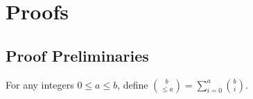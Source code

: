 \documentclass[final, 12pt]{colt2018}
\providecommand{\CD}{\mathrm{CD}}
\renewcommand{\eqref}[1]{Eq.~(\ref{#1})}
\newcommand{\thmref}[1]{Thm.~\ref{#1}}
\begin{document}

\nocite{*}



\appendix

\section{Proofs} \label{sec:proofs}

\subsection{Proof Preliminaries \label{sec:proof-prel}}

For any integers $0 \le a \le b$, define $\binom{b}{\le a} = \sum_{i=0}^a \binom{b}{i}$.
\end{document}
